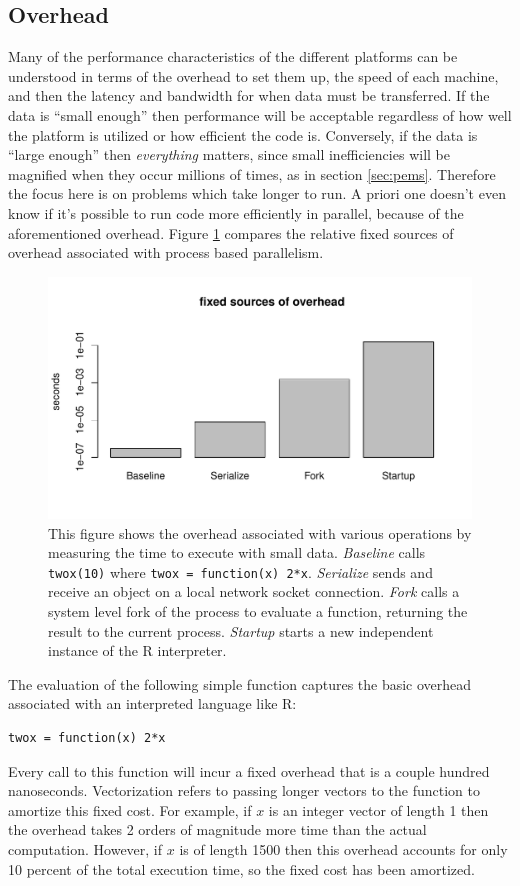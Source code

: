\documentclass[12pt]{article}
\begin{document}
\subsection{Overhead}

Many of the performance characteristics of the different platforms can be
understood in terms of the overhead to set them up, the speed of each
machine, and then the latency and bandwidth for when data must be
transferred.  If the data is ``small enough'' then performance will be
acceptable regardless of how well the platform is utilized or how efficient
the code is. Conversely, if the data is ``large enough'' then
\emph{everything} matters, since small inefficiencies will be magnified
when they occur millions of times, as in section \ref{sec:pems}.  Therefore
the focus here is on problems which take longer to run. A priori one
doesn't even know if it's possible to run code more efficiently in
parallel, because of the aforementioned overhead.
Figure \ref{fig:overhead} compares the relative fixed sources of overhead
associated with process based parallelism.

\begin{figure}
\centering
\includegraphics[width=.8\linewidth]{compute_times/overhead}

    \caption{
        This figure shows the overhead associated with various
    operations by measuring the time to execute with small data. 
    \emph{Baseline} calls \texttt{twox(10)} where \texttt{twox = function(x) 2*x}.
    \emph{Serialize} sends and receive an object on a local network socket connection.
    \emph{Fork} calls a system level fork of the process to evaluate a
    function, returning the result to the current process.
    \emph{Startup} starts a new independent instance of the R interpreter.
    }
\label{fig:overhead}
\end{figure}

The evaluation of the following simple
function captures the basic overhead associated with an interpreted
language like R:
\begin{verbatim}
twox = function(x) 2*x
\end{verbatim}
Every call to this function will incur a fixed overhead that is a couple
hundred nanoseconds. Vectorization refers to passing longer vectors to the
function to amortize this fixed cost. For example, if $x$ is an integer
vector of length 1 then the overhead takes 2 orders of magnitude more time
than the actual computation. However, if $x$ is of length 1500 then this
overhead accounts for only 10 percent of the total execution time, so the
fixed cost has been amortized.
\end{document}
